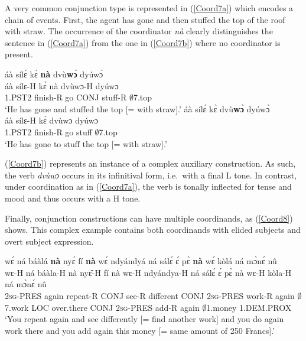 A very common conjunction type is represented in (\ref{Coord7a}) which encodes a chain of events. First, the agent has gone and then stuffed the top of the roof with straw. The occurrence of the coordinator {\itshape nà} clearly distinguishes the sentence in (\ref{Coord7a}) from the one in (\ref{Coord7b}) where no coordinator is present.

\begin{exe} 
\ex\label{Coord7}
\begin{xlist}
\ex\label{Coord7a}
  \glll áà sílɛ́ kɛ̀ {\bfseries nà} dvù{\bfseries wɔ́} dyúwɔ̀ \\
     áà sílɛ-H kɛ̀ nà dvùwɔ-H dyúwɔ \\
        1.PST2 finish-R go CONJ stuff-R $\emptyset$7.top \\
    \trans `He has gone and stuffed the top [= with straw].'
\ex\label{Coord7b}
  \glll áà sílɛ́ kɛ̀ dvù{\bfseries wɔ̀} dyúwɔ̀ \\
     áà sílɛ-H kɛ̀ dvùwɔ dyúwɔ \\
        1.PST2 finish-R go stuff $\emptyset$7.top \\
    \trans `He has gone to stuff the top [= with straw].'
\end{xlist}
\end{exe}

\noindent (\ref{Coord7b}) represents an instance of a complex auxiliary construction. As such, the verb {\itshape dvùwɔ} occurs in its infinitival form, i.e.\ with a final L tone. In contrast, under coordination as in (\ref{Coord7a}), the verb is tonally inflected for tense and mood and thus occurs with a H tone.


Finally, conjunction constructions can have multiple coordinands, as (\ref{Coord8}) shows. This complex example contains both coordinands with elided subjects and overt subject expression.

\begin{exe} 
\ex\label{Coord8} 
  \glll wɛ́ ná báàlá {\bfseries nà} nyɛ́ fí {\bfseries nà} wɛ́ ndyándyá ná sálɛ́ ɛ́ pɛ̀ {\bfseries nà} wɛ́ kòlá ná mɔ̀nɛ́ nû \\
      wɛ-H ná báàla-H nà nyɛ̂-H fí nà wɛ-H ndyándya-H ná sálɛ́ ɛ́ pɛ̀ nà wɛ-H kòla-H ná mɔ̀nɛ́ nû \\
         2\textsc{sg}-PRES again repeat-R CONJ see-R different CONJ 2\textsc{sg}-PRES work-R again $\emptyset$7.work LOC over.there CONJ 2\textsc{sg}-PRES add-R again $\emptyset$1.money 1.DEM.PROX \\
    \trans `You repeat again and see differently [= find another work] and you do again work there and you add again this money [= same amount of 250 Francs].'
\end{exe}

